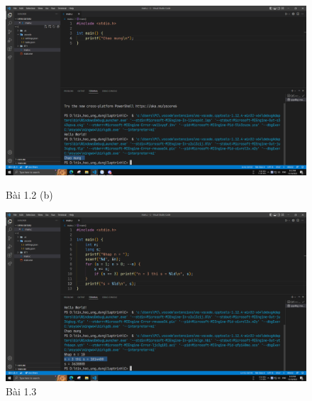 \documentclass[a4paper, 12pt, notitlepage]{article}
\begin{document}
	\newline
	\begin{figure}[h]
		\begin{center}
			\includegraphics[scale=0.28]{Screenshot_(1347).png}
		\end{center}
		\caption{Bài 1.2 (b)}
		\vspace{1cm}
		\begin{center}
			\includegraphics[scale=0.28]{Screenshot_(1348).png}
		\end{center}
		\caption{Bài 1.3}
	\end{figure}
\end{document}
